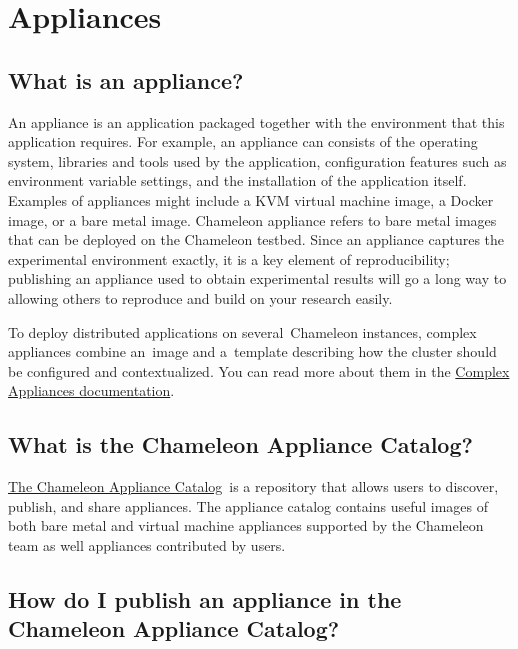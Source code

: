 \section{Appliances}\label{appliances}

\subsection{What is an appliance?}\label{what-is-an-appliance}

An appliance is an application packaged together with the environment
that this application requires. For example, an appliance can consists
of the operating system, libraries and tools used by the application,
configuration features such as environment variable settings, and the
installation of the application itself. Examples of appliances might
include a KVM virtual machine image, a Docker image, or a bare metal
image. Chameleon appliance refers to bare metal images that can be
deployed on the Chameleon testbed. Since an appliance captures the
experimental environment exactly, it is a key element of
reproducibility; publishing an appliance used to obtain experimental
results will go a long way to allowing others to reproduce and build on
your research easily.

To deploy distributed applications on several~Chameleon instances,
complex appliances combine an~image and a~template describing how the
cluster should be configured and contextualized. You can read more about
them in the
\href{https://www.chameleoncloud.org/docs/complex-appliances/}{Complex
Appliances documentation}.

\subsection{What is the Chameleon Appliance
Catalog?}\label{what-is-the-chameleon-appliance-catalog}

\href{https://www.chameleoncloud.org/appliances/}{The Chameleon
Appliance Catalog}~is a repository that allows users to discover,
publish, and share appliances. The appliance catalog contains useful
images of both bare metal and virtual machine appliances supported by
the Chameleon team as well appliances contributed by users.

\subsection{How do I publish an appliance in the Chameleon Appliance
Catalog?}\label{how-do-i-publish-an-appliance-in-the-chameleon-appliance-catalog}

